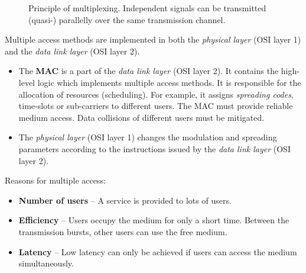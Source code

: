 \begin{refsection}
\begin{figure}[H]
	\centering
	\caption[Principle of multiplexing]{Principle of multiplexing. Independent signals can be transmitted (quasi-) parallelly over the same transmission channel.}
\end{figure}

Multiple access methods are implemented in both the \emph{physical layer} (\acs{OSI} layer 1) and the \emph{data link layer} (\acs{OSI} layer 2).
\begin{itemize}
	\item The  \textbf{\acf{MAC}} is a part of the \emph{data link layer} (\acs{OSI} layer 2). It contains the high-level logic which implements multiple access methods. It is responsible for the allocation of resources (scheduling). For example, it assigns \emph{spreading codes}, time-slots or sub-carriers to different users. The \ac{MAC} must provide reliable medium access. Data collisions of different users must be mitigated.
	\item The \emph{physical layer} (\acs{OSI} layer 1) changes the modulation and spreading parameters according to the instructions issued by the \emph{data link layer} (\acs{OSI} layer 2).
\end{itemize}

Reasons for multiple access:
\begin{itemize}
	\item \textbf{Number of users} -- A service is provided to lots of users.
	\item \textbf{Efficiency} -- Users occupy the medium for only a short time. Between the transmission bursts, other users can use the free medium.
	\item \textbf{Latency} -- Low latency can only be achieved if users can access the medium simultaneously.
\end{itemize}


\end{refsection}
